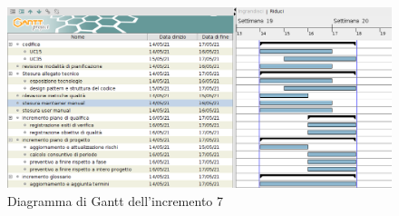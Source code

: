 \pagebreak
{}
\begin{figure}[!ht]
    \caption{Diagramma di Gantt dell'incremento 7}
    \vspace{5px}
    \includegraphics[scale=0.3]{../../../Images/Diagrammi/Gantt/incremento7.png}
    \centering
\end{figure}


